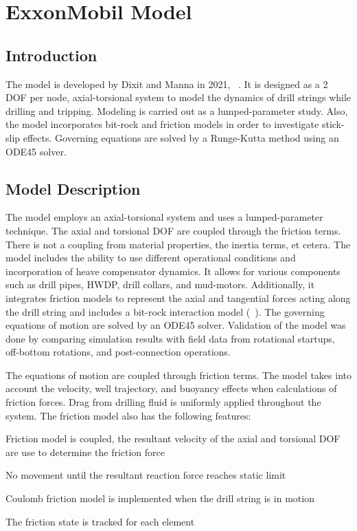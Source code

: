 \chapter{ExxonMobil Model}
\label{ch:exxonmobilmodel}

\section{Introduction}
The model is developed by Dixit and Manna in 2021, ~\cite{ref:dixit2021a}. It is designed as a 2 DOF per node, axial-torsional system to model the dynamics of drill strings while drilling and tripping. Modeling is carried out as a lumped-parameter study. Also, the model incorporates bit-rock and friction models in order to investigate stick-slip effects. Governing equations are solved by a Runge-Kutta method using an ODE45 solver. 

\section{Model Description}
The model employs an axial-torsional system and uses a lumped-parameter technique.  The axial and torsional DOF are coupled through the friction terms.  There is not a coupling from material properties, the inertia terms, et cetera.  The model includes the ability to use different operational conditions and incorporation of heave compensator dynamics.  It allows for various components such as drill pipes, HWDP, drill collars, and mud-motors. Additionally, it integrates friction models to represent the axial and tangential forces acting along the drill string and includes a bit-rock interaction model (~\cite{ref:dixit2021a}). The governing equations of motion are solved by an ODE45 solver. Validation of the model was done by comparing simulation results with field data from rotational startups, off-bottom rotations, and post-connection operations. 

The equations of motion are coupled through friction terms. The model takes into account the velocity, well trajectory, and buoyancy effects when calculations of friction forces. Drag from drilling fluid is uniformly applied throughout the system. The friction model also has the following features:
\begin{bulletedlist}
    \item Friction model is coupled, the resultant velocity of the axial and torsional DOF are use to determine the friction force
    \item No movement until the resultant reaction force reaches static limit
    \item Coulomb friction model is implemented when the drill string is in motion 
    \item The friction state is tracked for each element
\end{bulletedlist}

